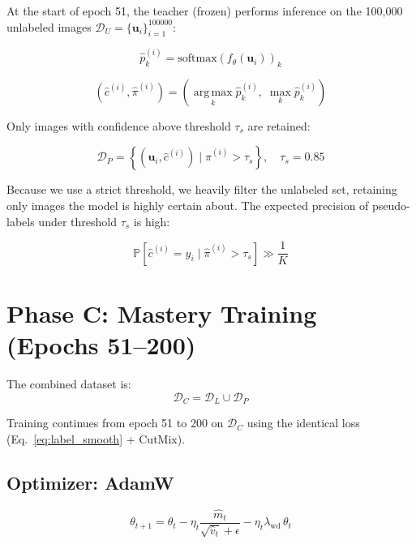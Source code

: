 \documentclass[12pt, a4paper]{article}
\begin{document}
At the start of epoch 51, the teacher (frozen) performs inference on the 100,000 unlabeled images $\mathcal{D}_U = \{\mathbf{u}_i\}_{i=1}^{100000}$:

\begin{equation}
  \hat{p}_k^{(i)} = \text{softmax}\!\left(f_\theta(\mathbf{u}_i)\right)_k
\end{equation}

\begin{equation}
  (\hat{c}^{(i)}, \hat{\pi}^{(i)}) = \left(\operatorname*{arg\,max}_k \hat{p}_k^{(i)},\; \max_k \hat{p}_k^{(i)}\right)
\end{equation}

Only images with confidence above threshold $\tau_s$ are retained:

\begin{equation}
  \mathcal{D}_P = \left\{(\mathbf{u}_i, \hat{c}^{(i)}) \;\Big|\; \hat{\pi}^{(i)} > \tau_s \right\}, \quad \tau_s = 0.85
\end{equation}

Because we use a strict threshold, we heavily filter the unlabeled set, retaining only images the model is highly certain about. The expected precision of pseudo-labels under threshold $\tau_s$ is high:

\begin{equation}
  \mathbb{P}[\hat{c}^{(i)} = y_i \mid \hat{\pi}^{(i)} > \tau_s] \gg \frac{1}{K}
\end{equation}

\section{Phase C: Mastery Training (Epochs 51--200)}

The combined dataset is:
\begin{equation}
  \mathcal{D}_C = \mathcal{D}_L \cup \mathcal{D}_P
\end{equation}

Training continues from epoch 51 to 200 on $\mathcal{D}_C$ using the identical loss (Eq.~\ref{eq:label_smooth} + CutMix).

\subsection{Optimizer: AdamW}

\begin{equation}
  \theta_{t+1} = \theta_t - \eta_t \frac{\hat{m}_t}{\sqrt{\hat{v}_t} + \epsilon} - \eta_t \lambda_{\text{wd}}\,\theta_t
\end{equation}
\end{document}
